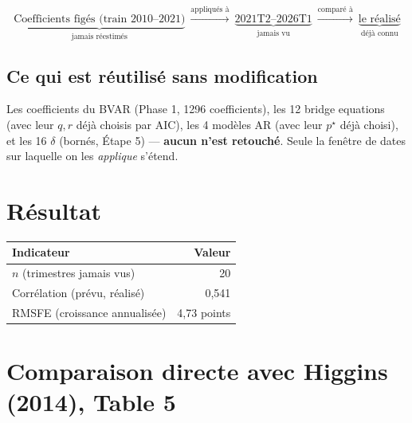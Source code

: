 \documentclass[11pt,a4paper]{article}
\begin{document}
\begin{equation}
\underbrace{\text{Coefficients figés (train 2010--2021)}}_{\text{jamais réestimés}} \ \xrightarrow{\text{appliqués à}}\ \underbrace{\text{2021T2--2026T1}}_{\text{jamais vu}} \ \xrightarrow{\text{comparé à}}\ \underbrace{\text{le réalisé}}_{\text{déjà connu}}
\end{equation}

\subsection{Ce qui est réutilisé sans modification}

Les coefficients du BVAR (Phase 1, 1296 coefficients), les 12 bridge equations (avec leur $q,r$ déjà choisis par AIC), les 4 modèles AR (avec leur $p^\star$ déjà choisi), et les 16 $\delta$ (bornés, Étape 5) --- \textbf{aucun n'est retouché}. Seule la fenêtre de dates sur laquelle on les \emph{applique} s'étend.

\section{Résultat}

\begin{resultatbox}
\begin{center}
\begin{tabular}{lr}
\toprule
\textbf{Indicateur} & \textbf{Valeur} \\
\midrule
$n$ (trimestres jamais vus) & 20 \\
Corrélation (prévu, réalisé) & 0,541 \\
RMSFE (croissance annualisée) & 4,73 points \\
\bottomrule
\end{tabular}
\end{center}
\end{resultatbox}

\section{Comparaison directe avec Higgins (2014), Table 5}
\end{document}
